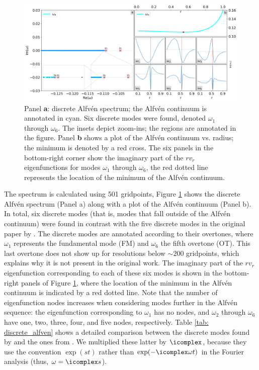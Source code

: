 \begin{figure}[t]
  \centering
  \includegraphics[width=\textwidth]{discrete_alfven.png}
  \caption{
    Panel \textbf{a}: discrete Alfv\'en spectrum; the Alfv\'en continuum is annotated in cyan. Six discrete modes were found, denoted $\omega_1$ through $\omega_6$. The insets depict zoom-ins; the regions are annotated in the figure. Panel \textbf{b} shows a plot of the Alfv\'en continuum vs. radius; the minimum is denoted by a red cross. The six panels in the bottom-right corner show the imaginary part of the $r v_r$ eigenfunctions for modes $\omega_1$ through $\omega_6$, the red dotted line represents the location of the minimum of the Alfv\'en continuum.
  }
  \label{fig: discrete_alfven}
\end{figure}

The spectrum is calculated using 501 gridpoints, Figure \ref{fig: discrete_alfven} shows the discrete Alfv\'en spectrum (Panel a) along with a plot of the Alfv\'en continuum (Panel b). In total, six discrete modes (that is, modes that fall outside of the Alfv\'en continuum) were found in contrast with the five discrete modes in the original paper by \citet{keppens1993}. The discrete modes are annotated according to their overtones, where $\omega_1$ represents the fundamental mode (FM) and $\omega_6$ the fifth overtone (OT). This last overtone does not show up for resolutions below $\sim 200$ gridpoints, which explains why it is not present in the original work. The imaginary part of the $r v_r$ eigenfunction corresponding to each of these six modes is shown in the bottom-right panels of Figure \ref{fig: discrete_alfven}, where the location of the minimum in the Alfv\'en continuum is indicated by a red dotted line. Note that the number of eigenfunction nodes increases when considering modes further in the Alfv\'en sequence: the eigenfunction corresponding to $\omega_1$ has no nodes, and $\omega_2$ through $\omega_6$ have one, two, three, four, and five nodes, respectively. Table \ref{tab: discrete_alfven} shows a detailed comparison between the discrete modes found by {\legolas} and the ones from \citet{keppens1993}.
We multiplied these latter by $\icomplex$, because they use the convention $\exp(st)$ rather than $\exp(-\icomplex \omega t)$ in the Fourier analysis (thus, $\omega = \icomplex s$).

